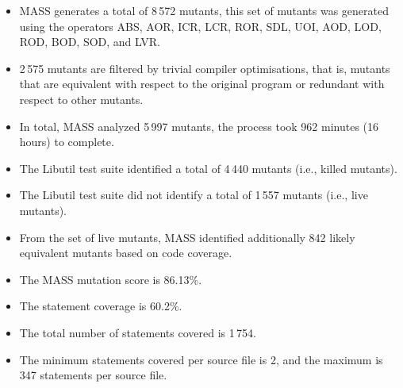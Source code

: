\begin{itemize}
	\item MASS generates a total of 8\,572 mutants, this set of mutants was generated using the operators ABS, AOR, ICR, LCR, ROR, SDL, UOI, AOD, LOD, ROD, BOD, SOD, and LVR.

	\item 2\,575 mutants are filtered by trivial compiler optimisations, that is, mutants that are equivalent with respect to the original program or redundant with respect to other mutants.

	\item In total, MASS analyzed 5\,997 mutants, the process took 962 minutes (16 hours) to complete.

	\item The Libutil test suite identified a total of 4\,440 mutants (i.e., killed mutants).

	\item The Libutil test suite did not identify a total of 1\,557 mutants (i.e., live mutants).

	\item From the set of live mutants, MASS identified additionally 842 likely equivalent mutants based on code coverage.

	\item The MASS mutation score is 86.13\%.

	\item The statement coverage is 60.2\%.
	
	\item The total number of statements covered is 1\,754.
	
	\item The minimum statements covered per source file is 2, and the maximum is 347 statements per source file.
\end{itemize}




